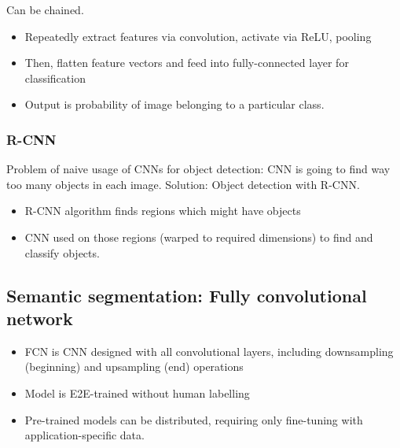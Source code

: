 Can be chained.

\begin{itemize}
		\item Repeatedly extract features via convolution, activate via ReLU, pooling
		\item Then, flatten feature vectors and feed into fully-connected layer
				for classification
		\item Output is probability of image belonging to a particular class.
\end{itemize}

\subsubsection{R-CNN}

Problem of naive usage of CNNs for object detection: CNN is going to find way
too many objects in each image. Solution: Object detection with R-CNN.

\begin{itemize}
		\item R-CNN algorithm finds regions which might have objects
		\item CNN used on those regions (warped to required dimensions) to find
				and classify objects.
\end{itemize}

\subsection{Semantic segmentation: Fully convolutional network}

\begin{itemize}
		\item FCN is CNN designed with all convolutional layers, including
				downsampling (beginning) and upsampling (end) operations
		\item Model is E2E-trained without human labelling
		\item Pre-trained models can be distributed, requiring only fine-tuning
				with application-specific data.
\end{itemize}

